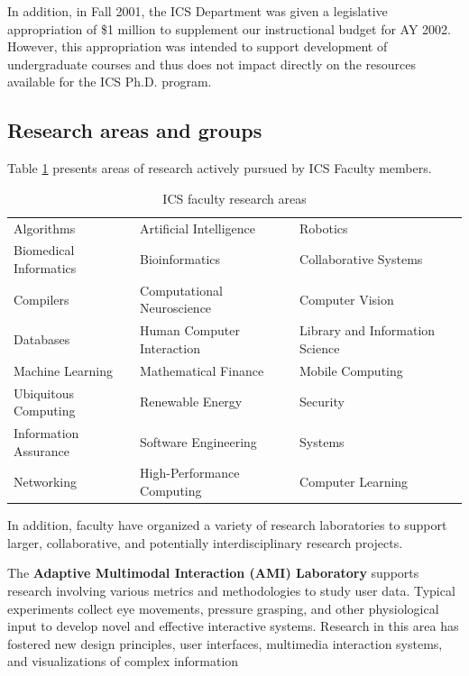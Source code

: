 \documentclass[12pt]{article}
\begin{document}
In addition, in Fall 2001, the ICS Department was given a legislative
appropriation of \$1 million to supplement our instructional budget for AY
2002. However, this appropriation was intended to support development of
undergraduate courses and thus does not impact directly on the resources
available for the ICS Ph.D. program. 

\subsection{Research areas and groups}

Table \ref{fig:research-areas} presents areas of research actively pursued
by ICS Faculty members. 

\begin{table}[htbp]
\begin{center}
\caption{ICS faculty research areas}
\label{fig:research-areas}
\begin{tabular}{|lll|} \hline
 Algorithms & Artificial Intelligence & Robotics \\
 Biomedical Informatics & Bioinformatics & Collaborative Systems \\
 Compilers & Computational Neuroscience & Computer Vision \\
 Databases & Human Computer Interaction & Library and Information Science \\
 Machine Learning & Mathematical Finance & Mobile Computing \\
 Ubiquitous Computing & Renewable Energy & Security \\
 Information Assurance & Software Engineering & Systems \\
 Networking & High-Performance Computing & Computer Learning \\ \hline
\end{tabular}
\end{center}
\end{table}

In addition, faculty have organized a variety of research laboratories to
support larger, collaborative, and potentially interdisciplinary research
projects.

\medskip\noindent The {\bf Adaptive Multimodal Interaction (AMI) Laboratory} supports
research involving various metrics and methodologies to study user
data. Typical experiments collect eye movements, pressure grasping, and
other physiological input to develop novel and effective interactive
systems.  Research in this area has fostered new design principles, user
interfaces, multimedia interaction systems, and visualizations of complex
information
\end{document}
